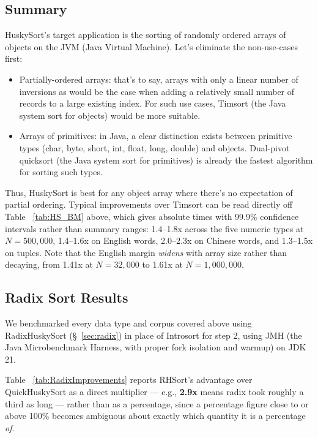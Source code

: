 \documentclass[twoside,leqno,twocolumn]{article}
\begin{document}
\subsection{Summary}
\label{sec:summary}
HuskySort’s target application is the sorting of randomly ordered arrays of objects on the JVM (Java Virtual Machine).
Let’s eliminate the non-use-cases first:
\begin{itemize}
\item {}Partially-ordered arrays:
that’s to say, arrays with only a linear number of inversions as would be the case when adding a relatively small number of records to a large existing index.
For such use cases, Timsort (the Java system sort for objects) would be more suitable.

\item {}Arrays of primitives:
in Java, a clear distinction exists between primitive types (char, byte, short, int, float, long, double) and objects.
Dual-pivot quicksort (the Java system sort for primitives) is already the fastest algorithm for sorting such types.
\end{itemize}
Thus, HuskySort is best for any object array where there’s no expectation of partial ordering.
Typical improvements over Timsort can be read directly off Table ~\ref{tab:HS_BM} above, which gives
absolute times with 99.9\% confidence intervals rather than summary ranges:
1.4--1.8x across the five numeric types at $N=500{,}000$,
1.4--1.6x on English words,
2.0--2.3x on Chinese words,
and 1.3--1.5x on tuples.
Note that the English margin \emph{widens} with array size rather than decaying,
from 1.41x at $N=32{,}000$ to 1.61x at $N=1{,}000{,}000$.

\subsection{Radix Sort Results}
\label{sec:radix-results}

We benchmarked every data type and corpus covered above using RadixHuskySort (\S~\ref{sec:radix})
in place of Introsort for step 2, using JMH (the Java Microbenchmark Harness, with proper fork isolation and warmup) on JDK 21.

Table ~\ref{tab:RadixImprovements} reports RHSort's advantage over QuickHuskySort as a direct multiplier —
e.g., \textbf{2.9x} means radix took roughly a third as long —
rather than as a percentage, since a percentage figure close to or above 100\% becomes ambiguous about exactly which quantity it is a percentage \emph{of}.
\end{document}
